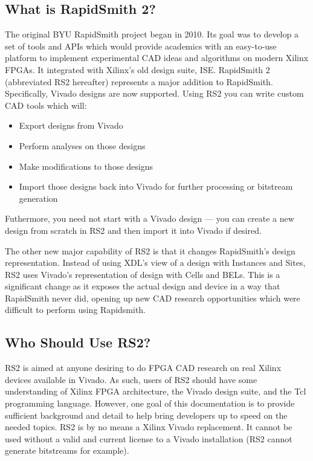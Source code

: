 \documentclass[10pt]{article}
\begin{document}
\subsection{What is RapidSmith 2?}
The original BYU RapidSmith project began in 2010. Its goal was to develop
a set of tools and APIs which would provide academics with an
easy-to-use platform to implement experimental CAD ideas and algorithms on
modern Xilinx FPGAs. It integrated with Xilinx's old design suite, ISE.
RapidSmith 2 (abbreviated RS2 hereafter) represents a major addition to
RapidSmith. Specifically, Vivado designs are now supported. Using RS2 you can
write custom CAD tools which will:
\begin{itemize}
  \item Export designs from Vivado
  \item Perform analyses on those designs
  \item Make modifications to those designs
  \item Import those designs back into Vivado for further processing or
  bitstream generation
\end{itemize}
Futhermore, you need not start with a Vivado design --- 
you can create a new design from scratch in RS2 and then import it into Vivado
if desired.

The other new major capability of RS2 is that it changes RapidSmith's design
representation. Instead of using XDL's view of a design with Instances and
Sites, RS2 uses Vivado's representation of design with Cells and BELs. This
is a significant change as it exposes the actual design and device in a way
that RapidSmith never did, opening up new CAD research opportunities which were
difficult to perform using Rapidsmith.
       
\subsection{Who Should Use RS2?}
RS2 is aimed at anyone desiring to do FPGA CAD research on real Xilinx devices
available in Vivado. As such, users of RS2 should have some understanding of
Xilinx FPGA architecture, the Vivado design suite, and the Tcl programming
language. However, one goal of this documentation is to provide sufficient
background and detail to help bring developers up to speed on the needed
topics. RS2 is by no means a Xilinx Vivado replacement. It cannot be used
without a valid and current license to a Vivado installation (RS2
cannot generate bitstreams for example).
\end{document}
